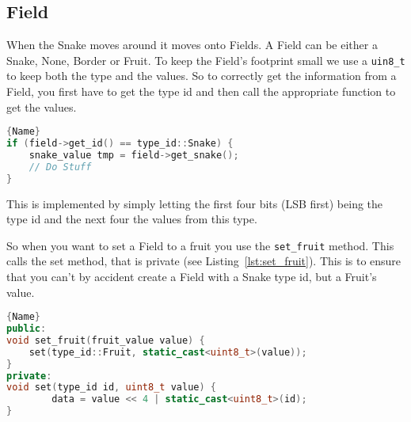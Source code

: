 \subsection{Field}

When the Snake moves around it moves onto Fields. A Field can be either a Snake, None, Border or Fruit. To keep the Field's footprint small we use a \texttt{uin8\_t} to keep both the type and the values. So to correctly get the information from a Field, you first have to get the type id and then call the appropriate function to get the values.

\begin{lstlisting}[caption={Getting correct data from a field},label={lst:get_snake},frame=tlrb, language=C++]{Name}
if (field->get_id() == type_id::Snake) {
    snake_value tmp = field->get_snake();
    // Do Stuff
}
\end{lstlisting}

This is implemented by simply letting the first four bits (LSB first) being the type id and the next four the values from this type.

So when you want to set a Field to a fruit you use the \texttt{set\_fruit} method. This calls the set method, that is private (see Listing~\ref{lst:set_fruit}). This is to ensure that you can't by accident create a Field with a Snake type id, but a Fruit's value.

\begin{lstlisting}[caption={Updating a Field},label={lst:set_fruit},frame=tlrb, language=C++]{Name}
public:
void set_fruit(fruit_value value) {
    set(type_id::Fruit, static_cast<uint8_t>(value));
}
private:
void set(type_id id, uint8_t value) {
		data = value << 4 | static_cast<uint8_t>(id);
}
\end{lstlisting}
